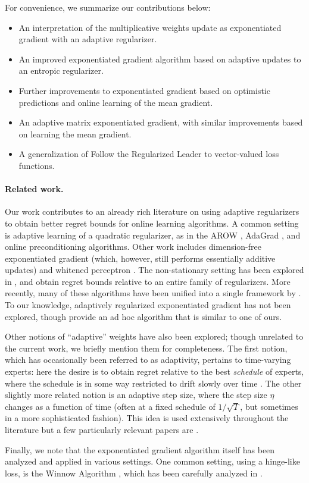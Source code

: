 \documentclass[paper_icml.tex]{subfiles}
\begin{document}
For convenience, we summarize our contributions below:
\begin{itemize}
\item An interpretation of the multiplicative weights update as 
      exponentiated gradient with an adaptive regularizer.
\item An improved exponentiated gradient algorithm based on adaptive 
      updates to an entropic regularizer.
\item Further improvements to exponentiated gradient based on optimistic 
      predictions and online learning of the mean gradient.
\item An adaptive matrix exponentiated gradient, with similar improvements 
      based on learning the mean gradient.
\item A generalization of Follow the Regularized Leader to vector-valued 
      loss functions.
\end{itemize}

\paragraph{Related work.} Our work contributes to an already rich literature 
on using adaptive regularizers to obtain 
better regret bounds for online learning algorithms. A common setting is 
adaptive learning of a quadratic regularizer, as in the AROW 
\cite{crammer2009arow}, AdaGrad \cite{duchi2011adagrad}, and online 
preconditioning \cite{streeter2010} algorithms. 
Other work includes dimension-free 
exponentiated gradient \cite{orabona2013dimension} (which, however, 
still performs essentially additive updates) and whitened perceptron 
\cite{cesa2005perceptron}. The non-stationary setting has been explored 
in \cite{vaits2013}, and \cite{mcmahan2010adaptive} obtain regret bounds 
relative to an entire family of regularizers. More recently, many of these 
algorithms have been unified into a single framework by \cite{orabona2013general}.
To our knowledge, adaptively regularized exponentiated gradient has not 
been explored, though \cite{hazan2010variation} provide an ad hoc algorithm 
that is similar to one of ours.

Other notions of ``adaptive'' weights have also been explored; though unrelated 
to the current work, we briefly mention them for completeness. The first 
notion, which has occasionally been referred to as adaptivity, pertains to time-varying experts: here the desire is to obtain regret relative to the best \emph{schedule} of experts, 
where the schedule is in some way restricted to drift slowly over time 
\cite{auer1998tracking, kleinberg2010regret, chiang2012online}. 
The other slightly more related notion is an adaptive step size, where the step 
size $\eta$ changes as a function of time (often at a fixed schedule of 
$1/\sqrt{T}$, but sometimes in a more sophisticated fashion). This idea is used 
extensively throughout the literature but a few particularly relevant papers are 
\cite{hazan2007adaptive, orabona2013dimension}.

Finally, we note that the exponentiated gradient algorithm itself has been analyzed 
and applied in various settings. One common setting, using a hinge-like loss, 
is the Winnow Algorithm \cite{littlestone1988}, which has been carefully analyzed in 
\cite{sabato2012learning}.
\end{document}
